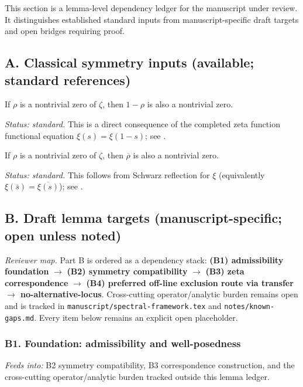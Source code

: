 This section is a lemma-level dependency ledger for the manuscript under review. It distinguishes established standard inputs from manuscript-specific draft targets and open bridges requiring proof.

\subsection*{A. Classical symmetry inputs (available; standard references)}

\begin{lemma}
If $\rho$ is a nontrivial zero of $\zeta$, then $1-\rho$ is also a nontrivial zero.
\end{lemma}
\noindent\emph{Status: standard.} This is a direct consequence of the completed zeta function functional equation $\xi(s)=\xi(1-s)$; see \cite{Edwards1974,Titchmarsh1986}.

\begin{lemma}
If $\rho$ is a nontrivial zero of $\zeta$, then $\overline{\rho}$ is also a nontrivial zero.
\end{lemma}
\noindent\emph{Status: standard.} This follows from Schwarz reflection for $\xi$ (equivalently $\xi(\bar s)=\overline{\xi(s)}$); see \cite{Edwards1974,Titchmarsh1986}.

\subsection*{B. Draft lemma targets (manuscript-specific; open unless noted)}
\noindent\emph{Reviewer map.} Part B is ordered as a dependency stack: \textbf{(B1) admissibility foundation} $\rightarrow$ \textbf{(B2) symmetry compatibility} $\rightarrow$ \textbf{(B3) zeta correspondence} $\rightarrow$ \textbf{(B4) preferred off-line exclusion route via transfer $\to$ no-alternative-locus}. Cross-cutting operator/analytic burden remains open and is tracked in \texttt{manuscript/spectral-framework.tex} and \texttt{notes/known-gaps.md}. Every item below remains an explicit open placeholder.

\subsubsection*{B1. Foundation: admissibility and well-posedness}

\begin{lemma}
\end{lemma}
\noindent\emph{Feeds into:} B2 symmetry compatibility, B3 correspondence construction, and the cross-cutting operator/analytic burden tracked outside this lemma ledger.


